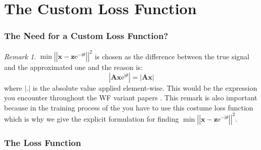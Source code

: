 \documentclass{beamer}
\newtheorem {Prop} [Thm]{Proposition}
\theoremstyle{definition}
\theoremstyle{remark}
\newtheorem {Rem} [Thm]{Remark}
\begin{document}
\section[The Custom Loss Function]{The Custom Loss Function}
\begin{frame}
  \frametitle{The Need for a Custom Loss Function?}
  \begin{Rem} 
    $\min \left|\left|\boldsymbol{x}-\boldsymbol{z}\mathrm{e}^{-\mathrm{i}\theta}\right|\right|^2$ is chosen as the difference between the 
    true signal and the approximated one and the reason is:
    \begin{equation}
      \left|\boldsymbol{A}\boldsymbol{x}\mathrm{e}^{\mathrm{i}\theta}\right| = \left|\boldsymbol{A}\boldsymbol{x}\right|
    \end{equation}
    where $\left|\boldsymbol{.}\right|$ is the absolute value applied element-wise. This would be the expression you encounter throughout the \ac{WF} variant papers \cite{Candes2014}\cite{Chen2015}\cite{Zhang2016}. 
    This remark is also important because in the training process of the \du you have to use this costume loss function which is why we give the explicit formulation 
    for finding $\min \left|\left|\boldsymbol{x}-\boldsymbol{z}\mathrm{e}^{-\mathrm{i}\theta}\right|\right|^2$.
  \end{Rem}
\end{frame}
\begin{frame}
\frametitle{The Loss Function}
\end{frame}
\end{document}
